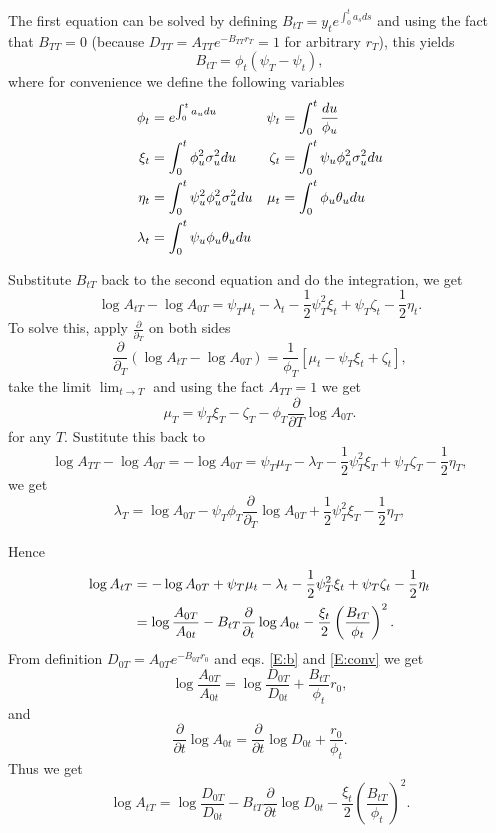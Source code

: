 The first equation can be solved by defining $B_{tT}=y_t e^{\int_0^t a_s ds}$
and using the fact that $B_{TT}=0$ (because $D_{TT}=A_{TT}e^{-B_{TT}r_T}=1$ for
arbitrary $r_T$), this yields
\begin{equation} \label{E:b}
  B_{tT} = \phi_t (\psi_T - \psi_t),
\end{equation}
where for convenience we define the following variables
\begin{align} \label{E:conv}
  \phi_t &= e^{\int_0^t a_u du} &
  \psi_t &= \int_0^t \frac{du}{\phi_u} \notag \\
  \xi_t &= \int_0^t \phi_u^2 \sigma_u^2 du  &
  \zeta_t &= \int_0^t \psi_u \phi_u^2 \sigma_u^2 du \notag \\
  \eta_t &= \int_0^t \psi_u^2 \phi_u^2 \sigma_u^2 du &
  \mu_t &= \int_0^t \phi_u \theta_u du \notag \\
  \lambda_t &= \int_0^t \psi_u \phi_u \theta_u du \notag \\
\end{align}

Substitute $B_{tT}$ back to the second equation and do the integration, we get 
\[
  \log{A_{tT}} - \log{A_{0T}} = \psi_T \mu_t - \lambda_t -
    \frac{1}{2}\psi_T^2\xi_t + \psi_T\zeta_t - \frac{1}{2} \eta_t.
\]
To solve this, apply $\frac{\partial}{\partial_T}$ on both sides
\[
  \frac{\partial}{\partial_T} \left( \log{A_{tT}} - \log{A_{0T}} \right)
    = \frac{1}{\phi_T} [\mu_t - \psi_T \xi_t + \zeta_t],
\]
take the limit $\lim_{t\to T}$ and using the fact $A_{TT}=1$ we get
\begin{equation} \label{E:mu}
  \mu_T = \psi_T \xi_T - \zeta_T 
          - \phi_T \frac{\partial}{\partial T} \log{A_{0T}}.
\end{equation}
for any $T$.
Sustitute this back to 
\[
  \log{A_{TT}} - \log{A_{0T}} 
    = - \log{A_{0T}}
    = \psi_T \mu_T - \lambda_T 
      - \frac{1}{2}\psi_T^2 \xi_T + \psi_T \zeta_T - \frac{1}{2} \eta_T,
\]
we get
\[
  \lambda_T = \log{A_{0T}} 
              - \psi_T \phi_T \frac{\partial}{\partial_T} \log{A_{0T}}
              + \frac{1}{2} \psi_T^2 \xi_T - \frac{1}{2} \eta_T,
\]

Hence
\begin{align*}
  \log{A_{tT}} 
    &= - \log{A_{0T}} + \psi_T \mu_t - \lambda_t -
       \frac{1}{2}\psi_T^2\xi_t + \psi_T\zeta_t - \frac{1}{2} \eta_t \notag \\
    &= \log{\frac{A_{0T}}{A_{0t}}} 
       - B_{tT}\frac{\partial}{\partial_t} \log{A_{0t}}
       - \frac{\xi_t}{2} \left( \frac{B_{tT}}{\phi_t} \right)^2. \notag \\
\end{align*}
From definition $D_{0T}=A_{0T} e^{-B_{0T} r_0}$ and eqs. \ref{E:b} and
\ref{E:conv} we get
\[
  \log{\frac{A_{0T}}{A_{0t}}} 
    = \log{\frac{D_{0T}}{D_{0t}}} + \frac{B_{tT}}{\phi_t} r_0,
\]
and
\[
  \frac{\partial}{\partial t} \log{A_{0t}}
    = \frac{\partial}{\partial t} \log{D_{0t}} + \frac{r_0}{\phi_t}.
\]
Thus we get
\begin{equation} \label{E:a}
  \log A_{tT} = \log \frac{D_{0T}}{D_{0t}} 
                - B_{tT} \frac{\partial}{\partial t} \log D_{0t} 
                - \frac{\xi_t}{2} \left( \frac{B_{tT}}{\phi_t} \right)^2.
\end{equation}

